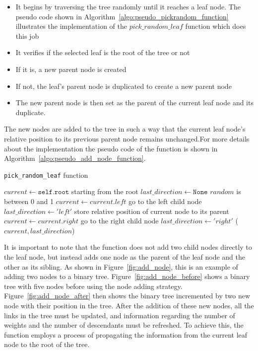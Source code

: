 \begin{itemize}
\item It begins by traversing the tree randomly until it reaches a leaf node. The pseudo code shown in Algorithm~\ref{algo:pseudo_pickrandom_function} illustrates the implementation of the $pick\_random\_leaf$ function which does this job
\item It verifies if the selected leaf is the root of the tree or not
\item If it is, a new parent node is created
\item If not, the leaf's parent node is duplicated to create a new parent node
\item The new parent node is then set as the parent of the current leaf node and its duplicate.
\end{itemize}

The new nodes are added to the tree in such a way that the current leaf node's relative position to its previous parent node remains unchanged.For more details about the implementation the pseudo code of the function is shown in Algorithm~\ref{algo:pseudo_add_node_function}.

\begin{algorithm}[!ht]
\caption{\texttt{pick\_random\_leaf} function}
\label{algo:pseudo_pickrandom_function}
\begin{algorithmic}
\State $current \gets \texttt{self.root}$ \Comment starting from the root 
\State $last\_direction \gets \texttt{None}$ 
 \Comment $random$ is between 0 and 1
\State $current \gets current.left$ \Comment go to the left child node
\State $last\_direction \gets 'left'$ \Comment store relative position of current node to its parent
\Else 
\State $current \gets current.right$ \Comment go to the right child node
\State $last\_direction \gets 'right'$ 
\EndIf
\EndWhile
\Return ($current, last\_direction$)
\EndFunction
\end{algorithmic}
\end{algorithm}

It is important to note that the function does not add two child nodes directly to the leaf node, but instead adds one node as the parent of the leaf node and the other as its sibling. As shown in Figure~\ref{fig:add_node}, this is an example of adding two nodes to a binary tree. Figure~\ref{fig:add_node_before} shows a binary tree with five nodes before using the node adding strategy. Figure~\ref{fig:add_node_after} then shows the binary tree incremented by two new node with their position in the tree. After the addition of these new nodes, all the links in the tree must be updated, and information regarding the number of weights and the number of descendants must be refreshed. To achieve this, the function employs a process of propagating the information from the current leaf node to the root of the tree.

